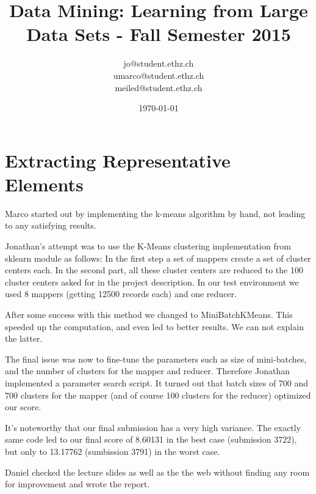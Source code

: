 \documentclass[a4paper, 11pt]{article}
\title{Data Mining: Learning from Large Data Sets - Fall Semester 2015}
\author{jo@student.ethz.ch\\ umarco@student.ethz.ch\\ meiled@student.ethz.ch\\}
\date{\today}
\begin{document}
\maketitle

\section*{Extracting Representative Elements}

Marco started out by implementing the k-means algorithm by hand, not leading to any satisfying results.

Jonathan's attempt was to use the K-Means clustering implementation from sklearn module as follows: In the first step a set of mappers create a set of cluster centers each. In the second part, all these cluster centers are reduced to the 100 cluster centers asked for in the project description. In our test environment we used 8 mappers (getting 12500 records each) and one reducer.

After some success with this method we changed to MiniBatchKMeans. This speeded up the computation, and even led to better results. We can not explain the latter.

The final issue was now to fine-tune the parameters such as size of mini-batches, and the number of clusters for the mapper and reducer. Therefore Jonathan implemented a parameter search script. It turned out that batch sizes of 700 and 700 clusters for the mapper (and of course 100 clusters for the reducer) optimized our score.

It's noteworthy that our final submission has a very high variance. The exactly same code led to our final score  of 8.60131 in the best case (submission 3722), but only to 13.17762 (sumbission 3791) in the worst case.

Daniel checked the lecture slides as well as the the web without finding any room for improvement and wrote the report.
\end{document}
